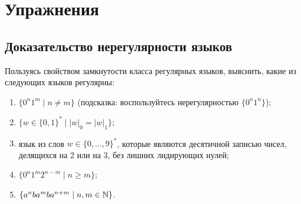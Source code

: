 \section{Упражнения}
\label{Chapter5Exs}
\subsection*{Доказательство нерегулярности языков}
Пользуясь свойством замкнутости
класса регулярных языков, выяснить, какие из следующих языков регулярны:
\begin{multicols}{2}
\begin{enumerate}
  \item $\{0^n 1^m \mid n \neq m\}$ (подсказка: воспользуйтесь
  нерегулярностью $\{0^n1^n\}$);
  \item $\{ w \in \{0, 1\}^* \mid
  |w|_0 = |w|_1\}$;
  \item язык из слов $w \in \{0,\ldots, 9\}^*$, которые
  являются десятичной записью чисел, делящихся на 2 или на 3, без
  лишних лидирующих нулей;
  \item $\{ 0^n 1^m 2^{n-m} \mid n \geqslant m \}$;
  \item $\{ a^n b a^m b a^{n+m} \mid n, m \in \mathbb N \}$.
\end{enumerate}
\end{multicols}
%
